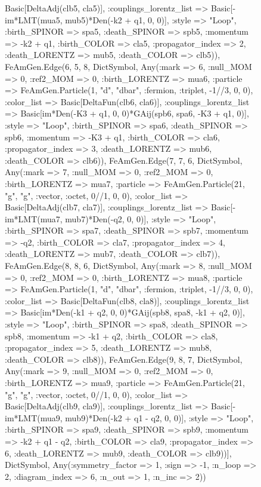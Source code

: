 \documentclass{revtex4}
\begin{document}
\begin{figure}[!htb]
\begin{center}
{Basic[DeltaAdj(clb5, cla5)], :couplings_lorentz_list => Basic[-im*LMT(mua5, mub5)*Den(-k2 + q1, 0, 0)], :style => "Loop", :birth_SPINOR => spa5, :death_SPINOR => spb5, :momentum => -k2 + q1, :birth_COLOR => cla5, :propagator_index => 2, :death_LORENTZ => mub5, :death_COLOR => clb5)), FeAmGen.Edge(6, 5, 8, Dict{Symbol, Any}(:mark => 6, :null_MOM => 0, :ref2_MOM => 0, :birth_LORENTZ => mua6, :particle => FeAmGen.Particle(1, "d", "dbar", :fermion, :triplet, -1//3, 0, 0), :color_list => Basic[DeltaFun(clb6, cla6)], :couplings_lorentz_list => Basic[im*Den(-K3 + q1, 0, 0)*GAij(spb6, spa6, -K3 + q1, 0)], :style => "Loop", :birth_SPINOR => spa6, :death_SPINOR => spb6, :momentum => -K3 + q1, :birth_COLOR => cla6, :propagator_index => 3, :death_LORENTZ => mub6, :death_COLOR => clb6)), FeAmGen.Edge(7, 7, 6, Dict{Symbol, Any}(:mark => 7, :null_MOM => 0, :ref2_MOM => 0, :birth_LORENTZ => mua7, :particle => FeAmGen.Particle(21, "g", "g", :vector, :octet, 0//1, 0, 0), :color_list => Basic[DeltaAdj(clb7, cla7)], :couplings_lorentz_list => Basic[-im*LMT(mua7, mub7)*Den(-q2, 0, 0)], :style => "Loop", :birth_SPINOR => spa7, :death_SPINOR => spb7, :momentum => -q2, :birth_COLOR => cla7, :propagator_index => 4, :death_LORENTZ => mub7, :death_COLOR => clb7)), FeAmGen.Edge(8, 8, 6, Dict{Symbol, Any}(:mark => 8, :null_MOM => 0, :ref2_MOM => 0, :birth_LORENTZ => mua8, :particle => FeAmGen.Particle(1, "d", "dbar", :fermion, :triplet, -1//3, 0, 0), :color_list => Basic[DeltaFun(clb8, cla8)], :couplings_lorentz_list => Basic[im*Den(-k1 + q2, 0, 0)*GAij(spb8, spa8, -k1 + q2, 0)], :style => "Loop", :birth_SPINOR => spa8, :death_SPINOR => spb8, :momentum => -k1 + q2, :birth_COLOR => cla8, :propagator_index => 5, :death_LORENTZ => mub8, :death_COLOR => clb8)), FeAmGen.Edge(9, 8, 7, Dict{Symbol, Any}(:mark => 9, :null_MOM => 0, :ref2_MOM => 0, :birth_LORENTZ => mua9, :particle => FeAmGen.Particle(21, "g", "g", :vector, :octet, 0//1, 0, 0), :color_list => Basic[DeltaAdj(clb9, cla9)], :couplings_lorentz_list => Basic[-im*LMT(mua9, mub9)*Den(-k2 + q1 - q2, 0, 0)], :style => "Loop", :birth_SPINOR => spa9, :death_SPINOR => spb9, :momentum => -k2 + q1 - q2, :birth_COLOR => cla9, :propagator_index => 6, :death_LORENTZ => mub9, :death_COLOR => clb9))], Dict{Symbol, Any}(:symmetry_factor => 1, :sign => -1, :n_loop => 2, :diagram_index => 6, :n_out => 1, :n_inc => 2)) 
}
\end{center}
\end{figure}
\end{document}
